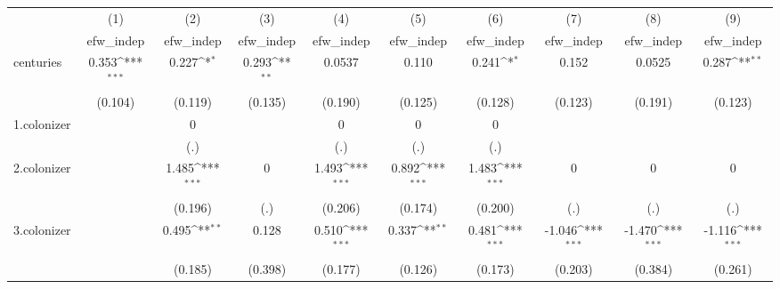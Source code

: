 {
\def\sym#1{\ifmmode^{#1}\else\(^{#1}\)\fi}
\begin{tabular}{l*{9}{c}}
\hline\hline
            &\multicolumn{1}{c}{(1)}&\multicolumn{1}{c}{(2)}&\multicolumn{1}{c}{(3)}&\multicolumn{1}{c}{(4)}&\multicolumn{1}{c}{(5)}&\multicolumn{1}{c}{(6)}&\multicolumn{1}{c}{(7)}&\multicolumn{1}{c}{(8)}&\multicolumn{1}{c}{(9)}\\
            &\multicolumn{1}{c}{efw\_indep}&\multicolumn{1}{c}{efw\_indep}&\multicolumn{1}{c}{efw\_indep}&\multicolumn{1}{c}{efw\_indep}&\multicolumn{1}{c}{efw\_indep}&\multicolumn{1}{c}{efw\_indep}&\multicolumn{1}{c}{efw\_indep}&\multicolumn{1}{c}{efw\_indep}&\multicolumn{1}{c}{efw\_indep}\\
\hline
centuries   &       0.353\sym{***}&       0.227\sym{*}  &       0.293\sym{**} &      0.0537         &       0.110         &       0.241\sym{*}  &       0.152         &      0.0525         &       0.287\sym{**} \\
            &     (0.104)         &     (0.119)         &     (0.135)         &     (0.190)         &     (0.125)         &     (0.128)         &     (0.123)         &     (0.191)         &     (0.123)         \\
[1em]
1.colonizer &                     &           0         &                     &           0         &           0         &           0         &                     &                     &                     \\
            &                     &         (.)         &                     &         (.)         &         (.)         &         (.)         &                     &                     &                     \\
[1em]
2.colonizer &                     &       1.485\sym{***}&           0         &       1.493\sym{***}&       0.892\sym{***}&       1.483\sym{***}&           0         &           0         &           0         \\
            &                     &     (0.196)         &         (.)         &     (0.206)         &     (0.174)         &     (0.200)         &         (.)         &         (.)         &         (.)         \\
[1em]
3.colonizer &                     &       0.495\sym{**} &       0.128         &       0.510\sym{***}&       0.337\sym{**} &       0.481\sym{***}&      -1.046\sym{***}&      -1.470\sym{***}&      -1.116\sym{***}\\
            &                     &     (0.185)         &     (0.398)         &     (0.177)         &     (0.126)         &     (0.173)         &     (0.203)         &     (0.384)         &     (0.261)         \\

\end{tabular}}
